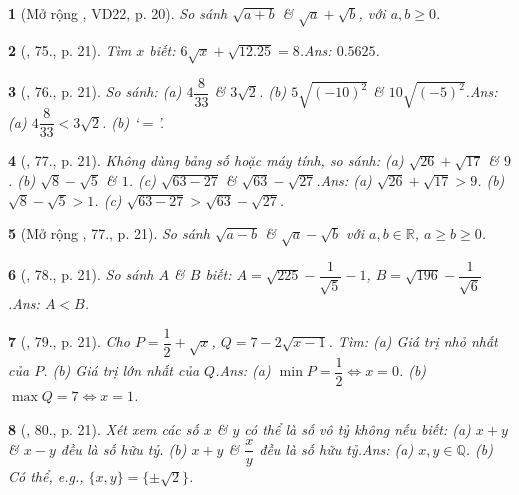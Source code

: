 \documentclass{article}
\newtheorem{baitoan}{}
\begin{document}
\begin{baitoan}[Mở rộng \cite{Tuyen_Toan_7}, VD22, p. 20]
	So sánh $\sqrt{a + b}$ \& $\sqrt{a} + \sqrt{b}$, với $a,b\ge 0$.
\end{baitoan}

\begin{baitoan}[\cite{Tuyen_Toan_7}, 75., p. 21]
	Tìm $x$ biết: $6\sqrt{x} + \sqrt{12.25} = 8$.\hfill{\sf Ans:} $0.5625$.
\end{baitoan}

\begin{baitoan}[\cite{Tuyen_Toan_7}, 76., p. 21]
	So sánh: (a) $4\dfrac{8}{33}$ \& $3\sqrt{2}$. (b) $5\sqrt{(-10)^2}$ \& $10\sqrt{(-5)^2}$.\hfill{\sf Ans:} (a) $4\dfrac{8}{33} < 3\sqrt{2}$. (b) `$=$'.
\end{baitoan}

\begin{baitoan}[\cite{Tuyen_Toan_7}, 77., p. 21]
	Không dùng bảng số hoặc máy tính, so sánh: (a) $\sqrt{26} + \sqrt{17}$ \& $9$. (b) $\sqrt{8} - \sqrt{5}$ \& $1$. (c) $\sqrt{63 - 27}$ \& $\sqrt{63} - \sqrt{27}$.\hfill{\sf Ans:} (a) $\sqrt{26} + \sqrt{17} > 9$. (b) $\sqrt{8} - \sqrt{5} > 1$. (c) $\sqrt{63 - 27} > \sqrt{63} - \sqrt{27}$.
\end{baitoan}

\begin{baitoan}[Mở rộng \cite{Tuyen_Toan_7}, 77., p. 21]
	So sánh $\sqrt{a - b}$ \& $\sqrt{a} - \sqrt{b}$ với $a,b\in\mathbb{R}$, $a\ge b\ge 0$.
\end{baitoan}

\begin{baitoan}[\cite{Tuyen_Toan_7}, 78., p. 21]
	So sánh $A$ \& $B$ biết: $A = \sqrt{225} - \dfrac{1}{\sqrt{5}} - 1$, $B = \sqrt{196} - \dfrac{1}{\sqrt{6}}$.\hfill{\sf Ans:} $A < B$.
\end{baitoan}

\begin{baitoan}[\cite{Tuyen_Toan_7}, 79., p. 21]
	Cho $P = \dfrac{1}{2} + \sqrt{x}$, $Q = 7 - 2\sqrt{x - 1}$. Tìm: (a) Giá trị nhỏ nhất của $P$. (b) Giá trị lớn nhất của $Q$.\hfill{\sf Ans:} (a) $\min P = \dfrac{1}{2}\Leftrightarrow x = 0$. (b) $\max Q = 7\Leftrightarrow x = 1$.
\end{baitoan}

\begin{baitoan}[\cite{Tuyen_Toan_7}, 80., p. 21]
	Xét xem các số $x$ \& $y$ có thể là số vô tỷ không nếu biết: (a) $x + y$ \& $x - y$ đều là số hữu tỷ. (b) $x + y$ \& $\dfrac{x}{y}$ đều là số hữu tỷ.\hfill{\sf Ans:} (a) $x,y\in\mathbb{Q}$. (b) Có thể, e.g., $\{x,y\} = \{\pm\sqrt{2}\}$.
\end{baitoan}
\end{document}
